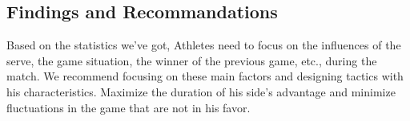 \subsection*{Findings and Recommandations}
Based on the statistics we've got, Athletes need to focus on the influences of the serve, the game situation, the winner of the previous game, etc., during the match. We recommend focusing on these main factors and designing tactics with his characteristics. Maximize the duration of his side's advantage and minimize fluctuations in the game that are not in his favor. 
